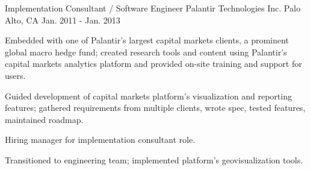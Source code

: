 \begin{cventries}
  \cventry
    {Implementation Consultant / Software Engineer} %
    {Palantir Technologies Inc.} %
    {Palo Alto, CA} %
    {Jan. 2011 - Jan. 2013} %
    {
      \begin{cvitems} %
        \item {Embedded with one of Palantir's largest capital markets clients, a prominent global macro hedge fund; created research tools and content using Palantir's capital markets analytics platform and provided on-site training and support for users.}
        \item {Guided development of capital markets platform's visualization and reporting features; gathered requirements from multiple clients, wrote spec, tested features, maintained roadmap.}
        \item {Hiring manager for implementation consultant role.}
        \item {Transitioned to engineering team; implemented platform's geovisualization tools.}
      \end{cvitems}
    }

\end{cventries}

